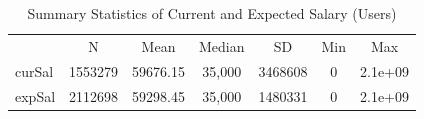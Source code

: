 \begin{table}[htbp]\centering
\def\sym#1{\ifmmode^{#1}\else\(^{#1}\)\fi}
\caption{Summary Statistics of Current and Expected Salary  (Users)}
\begin{tabular}{l*{1}{cccccc}}
\toprule
                    &           N&        Mean&      Median&          SD&         Min&         Max\\
\label{tab:usersalary}
curSal              &     1553279&    59676.15&      35,000&     3468608&           0&     2.1e+09\\
expSal              &     2112698&    59298.45&      35,000&     1480331&           0&     2.1e+09\\
\bottomrule
\end{tabular}
\end{table}
